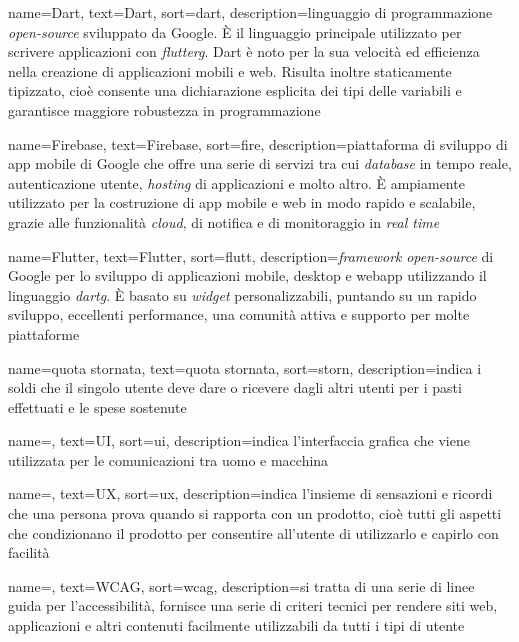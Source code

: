  {
    name=Dart,
    text=Dart,
    sort=dart,
    description={linguaggio di programmazione \textit{open-source} sviluppato da Google. 
    È il linguaggio principale utilizzato per scrivere applicazioni con \emph{\gls{flutterg}}. Dart è noto per la sua velocità ed efficienza nella creazione di applicazioni mobili e web.
    Risulta inoltre staticamente tipizzato, cioè consente una dichiarazione esplicita dei tipi delle variabili e garantisce maggiore robustezza in programmazione}
}

 {
    name=Firebase,
    text=Firebase,
    sort=fire,
    description={piattaforma di sviluppo di app mobile di Google che offre una serie di servizi tra cui \emph{database} in tempo reale, autenticazione utente, \emph{hosting} di applicazioni e molto altro. 
    È ampiamente utilizzato per la costruzione di app mobile e web in modo rapido e scalabile, grazie alle funzionalità \emph{cloud}, di notifica e di monitoraggio in \emph{real time}}
}

 {
    name=Flutter,
    text=Flutter,
    sort=flutt,
    description={\textit{framework} \textit{open-source} di Google per lo sviluppo di applicazioni mobile, desktop e webapp utilizzando il linguaggio \emph{\gls{dartg}}. È basato su \emph{widget} personalizzabili, puntando su un rapido sviluppo, eccellenti performance, una comunità attiva e supporto per molte piattaforme}
}

 {
    name=quota stornata,
    text=quota stornata,
    sort=storn,
    description={indica i soldi che il singolo utente deve dare o ricevere dagli altri utenti per i pasti effettuati e le spese sostenute}
}

 {
    name=,
    text=UI,
    sort=ui,
    description={indica l'interfaccia grafica che viene utilizzata per le comunicazioni tra uomo e macchina}
}

 {
    name=,
    text=UX,
    sort=ux,
    description={indica l'insieme di sensazioni e ricordi che una persona prova quando si rapporta con un prodotto, cioè tutti gli aspetti che condizionano il prodotto per consentire all'utente di utilizzarlo e capirlo con facilità}
}

 {
    name=,
    text=WCAG,
    sort=wcag,
    description={si tratta di una serie di linee guida per l'accessibilità, fornisce una serie di criteri tecnici per rendere siti web, applicazioni e altri contenuti facilmente utilizzabili da tutti i tipi di utente}
}
